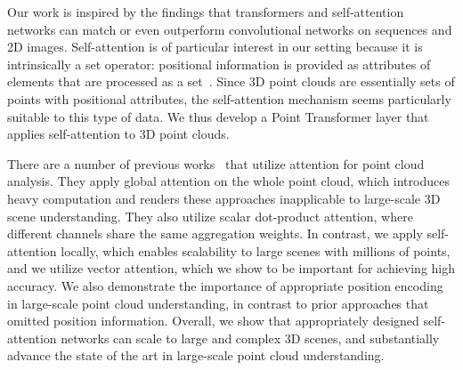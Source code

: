 Our work is inspired by the findings that transformers and self-attention networks can match or even outperform convolutional networks on sequences and 2D images. 
Self-attention is of particular interest in our setting because it is intrinsically a set operator: positional information is provided as attributes of elements that are processed as a set~\cite{vaswani2017attention,zhao2020san}. Since 3D point clouds are essentially sets of points with positional attributes, the self-attention mechanism seems particularly suitable to this type of data. We thus develop a Point Transformer layer that applies self-attention to 3D point clouds.

There are a number of previous works~\cite{xie2018attentional,liu2019point2sequence,yang2019modeling,lee2019set} that utilize attention for point cloud analysis. They apply global attention on the whole point cloud, which introduces heavy computation and renders these approaches inapplicable to large-scale 3D scene understanding. They also utilize scalar dot-product attention, where different channels share the same aggregation weights. In contrast, we apply self-attention locally, which enables scalability to large scenes with millions of points, and we utilize vector attention, which we show to be important for achieving high accuracy. We also demonstrate the importance of appropriate position encoding in large-scale point cloud understanding, in contrast to prior approaches that omitted position information. Overall, we show that appropriately designed self-attention networks can scale to large and complex 3D scenes, and substantially advance the state of the art in large-scale point cloud understanding.